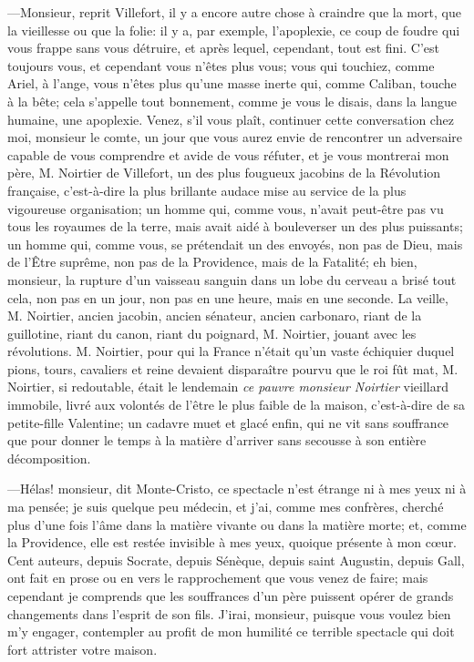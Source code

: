 —Monsieur, reprit Villefort, il y a encore autre chose à craindre que la mort, que la vieillesse ou que la folie: il y a, par exemple, l'apoplexie, ce coup de foudre qui vous frappe sans vous détruire, et après lequel, cependant, tout est fini. C'est toujours vous, et cependant vous n'êtes plus vous; vous qui touchiez, comme Ariel, à l'ange, vous n'êtes plus qu'une masse inerte qui, comme Caliban, touche à la bête; cela s'appelle tout bonnement, comme je vous le disais, dans la langue humaine, une apoplexie. Venez, s'il vous plaît, continuer cette conversation chez moi, monsieur le comte, un jour que vous aurez envie de rencontrer un adversaire capable de vous comprendre et avide de vous réfuter, et je vous montrerai mon père, M. Noirtier de Villefort, un des plus fougueux jacobins de la Révolution française, c'est-à-dire la plus brillante audace mise au service de la plus vigoureuse organisation; un homme qui, comme vous, n'avait peut-être pas vu tous les royaumes de la terre, mais avait aidé à bouleverser un des plus puissants; un homme qui, comme vous, se prétendait un des envoyés, non pas de Dieu, mais de l'Être suprême, non pas de la Providence, mais de la Fatalité; eh bien, monsieur, la rupture d'un vaisseau sanguin dans un lobe du cerveau a brisé tout cela, non pas en un jour, non pas en une heure, mais en une seconde. La veille, M. Noirtier, ancien jacobin, ancien sénateur, ancien carbonaro, riant de la guillotine, riant du canon, riant du poignard, M. Noirtier, jouant avec les révolutions. M. Noirtier, pour qui la France n'était qu'un vaste échiquier duquel pions, tours, cavaliers et reine devaient disparaître pourvu que le roi fût mat, M. Noirtier, si redoutable, était le lendemain \textit{ce pauvre monsieur Noirtier} vieillard immobile, livré aux volontés de l'être le plus faible de la maison, c'est-à-dire de sa petite-fille Valentine; un cadavre muet et glacé enfin, qui ne vit sans souffrance que pour donner le temps à la matière d'arriver sans secousse à son entière décomposition. 

—Hélas! monsieur, dit Monte-Cristo, ce spectacle n'est étrange ni à mes yeux ni à ma pensée; je suis quelque peu médecin, et j'ai, comme mes confrères, cherché plus d'une fois l'âme dans la matière vivante ou dans la matière morte; et, comme la Providence, elle est restée invisible à mes yeux, quoique présente à mon cœur. Cent auteurs, depuis Socrate, depuis Sénèque, depuis saint Augustin, depuis Gall, ont fait en prose ou en vers le rapprochement que vous venez de faire; mais cependant je comprends que les souffrances d'un père puissent opérer de grands changements dans l'esprit de son fils. J'irai, monsieur, puisque vous voulez bien m'y engager, contempler au profit de mon humilité ce terrible spectacle qui doit fort attrister votre maison. 

